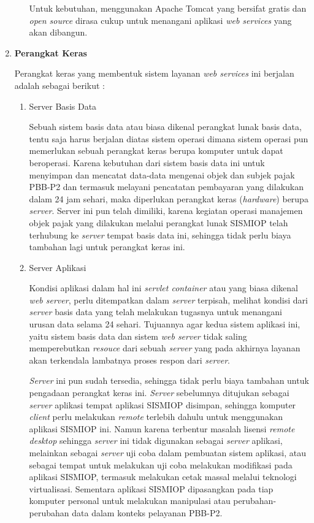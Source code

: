 \documentclass[pdftex,12pt, oneside]{article}
\begin{document}
\begin{enumerate}
\begin{enumerate}
  Untuk kebutuhan, menggunakan Apache Tomcat yang bersifat gratis dan \textit{open source} dirasa cukup untuk menangani aplikasi \textit{web services} yang akan dibangun.
  
\end{enumerate}

\item \textbf{Perangkat Keras}

Perangkat keras yang membentuk sistem layanan \textit{web services} ini berjalan adalah sebagai berikut :

\begin{enumerate}
  \item Server Basis Data
  
  Sebuah sistem basis data atau biasa dikenal perangkat lunak basis data, tentu saja harus berjalan diatas sistem operasi dimana sistem operasi pun memerlukan sebuah perangkat keras berupa komputer untuk dapat beroperasi. Karena kebutuhan dari sistem basis data ini untuk menyimpan dan mencatat data-data mengenai objek dan subjek pajak PBB-P2 dan termasuk melayani pencatatan pembayaran yang dilakukan dalam 24 jam sehari, maka diperlukan perangkat keras (\textit{hardware}) berupa \textit{server}. Server ini pun telah dimiliki, karena kegiatan operasi manajemen objek pajak yang dilakukan melalui perangkat lunak SISMIOP telah terhubung ke \textit{server} tempat basis data ini, sehingga tidak perlu biaya tambahan lagi untuk perangkat keras ini.
  
  \item Server Aplikasi
  
  Kondisi aplikasi dalam hal ini \textit{servlet container} atau yang biasa dikenal \textit{web server}, perlu ditempatkan dalam \textit{server} terpisah, melihat kondisi dari \textit{server} basis data yang telah melakukan tugasnya untuk menangani urusan data selama 24 sehari. Tujuannya agar kedua sistem aplikasi ini, yaitu sistem basis data dan sistem \textit{web server} tidak saling memperebutkan \textit{resouce} dari sebuah \textit{server} yang pada akhirnya layanan akan terkendala lambatnya proses respon dari \textit{server}.
  
  \textit{Server} ini pun sudah tersedia, sehingga tidak perlu biaya tambahan untuk pengadaan perangkat keras ini. \textit{Server} sebelumnya ditujukan sebagai \textit{server} aplikasi tempat aplikasi SISMIOP disimpan, sehingga komputer \textit{client} perlu melakukan \textit{remote} terlebih dahulu untuk menggunakan aplikasi SISMIOP ini. Namun karena terbentur masalah lisensi \textit{remote desktop} sehingga \textit{server} ini tidak digunakan sebagai \textit{server} aplikasi, melainkan sebagai \textit{server} uji coba dalam pembuatan sistem aplikasi, atau sebagai tempat untuk melakukan uji coba melakukan modifikasi pada aplikasi SISMIOP, termasuk melakukan cetak massal melalui teknologi virtualisasi. Sementara aplikasi SISMIOP dipasangkan pada tiap komputer personal untuk melakukan manipulasi atau perubahan-perubahan data dalam konteks pelayanan PBB-P2.
  

\end{enumerate}
\end{enumerate}
\end{document}
